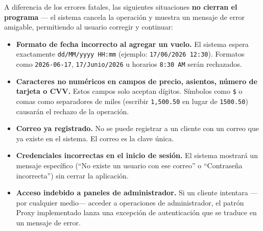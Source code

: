 \documentclass[12pt, letterpaper]{article}
\begin{document}
\begin{tcolorbox}[colback=lightgray, colframe=primary, title=\textbf{3. ADVERTENCIA LÓGICA: Operaciones Rechazadas por el Sistema}]
	A diferencia de los errores fatales, las siguientes situaciones \textbf{no cierran el programa} — el sistema cancela la operación y muestra un mensaje de error amigable, permitiendo al usuario corregir y continuar:
	\begin{itemize}
		\item \textbf{Formato de fecha incorrecto al agregar un vuelo.} El sistema espera exactamente \texttt{dd/MM/yyyy HH:mm} (ejemplo: \texttt{17/06/2026 12:30}). Formatos como \texttt{2026-06-17}, \texttt{17/Junio/2026} u horarios \texttt{8:30 AM} serán rechazados.
		\item \textbf{Caracteres no numéricos en campos de precio, asientos, número de tarjeta o CVV.} Estos campos solo aceptan dígitos. Símbolos como \texttt{\$} o comas como separadores de miles (escribir \texttt{1,500.50} en lugar de \texttt{1500.50}) causarán el rechazo de la operación.
		\item \textbf{Correo ya registrado.} No se puede registrar a un cliente con un correo que ya existe en el sistema. El correo es la clave única.
		\item \textbf{Credenciales incorrectas en el inicio de sesión.} El sistema mostrará un mensaje específico (``No existe un usuario con ese correo'' o ``Contraseña incorrecta'') sin cerrar la aplicación.
		\item \textbf{Acceso indebido a paneles de administrador.} Si un cliente intentara —por cualquier medio— acceder a operaciones de administrador, el patrón Proxy implementado lanza una excepción de autenticación que se traduce en un mensaje de error.
	\end{itemize}
\end{tcolorbox}
\end{document}
